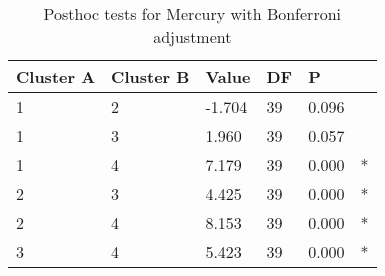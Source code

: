 \begin{table}[h]
\caption{Posthoc tests for Mercury with Bonferroni adjustment}
\label{tab:posthoc_Mercury}
\begin{tabular}{llllll}
\toprule
Cluster A & Cluster B & Value & DF & P &   \\
\midrule
1 & 2 & -1.704 & 39 & 0.096 &   \\
1 & 3 & 1.960 & 39 & 0.057 &   \\
1 & 4 & 7.179 & 39 & 0.000 & * \\
2 & 3 & 4.425 & 39 & 0.000 & * \\
2 & 4 & 8.153 & 39 & 0.000 & * \\
3 & 4 & 5.423 & 39 & 0.000 & * \\
\bottomrule
\end{tabular}
\end{table}
